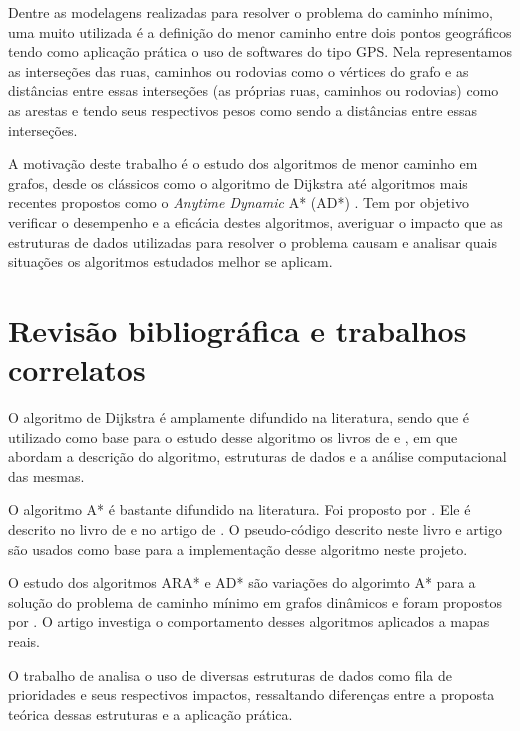 Dentre as modelagens realizadas para resolver o problema do caminho mínimo, uma muito utilizada é a definição do menor caminho entre dois pontos geográficos tendo como aplicação prática o uso de softwares do tipo GPS. Nela representamos as interseções das ruas, caminhos ou rodovias como o vértices do grafo e as distâncias entre essas interseções (as próprias ruas, caminhos ou rodovias) como as arestas e tendo seus respectivos pesos como sendo a distâncias entre essas interseções.


A motivação deste trabalho é o estudo dos algoritmos de menor caminho em grafos, desde os clássicos como o algoritmo de Dijkstra \cite{dijkstra1959note} até algoritmos mais recentes propostos como o \textit{Anytime Dynamic} A* (AD*) \cite{likhachev2008anytime}. Tem por  objetivo verificar o desempenho e a eficácia destes algoritmos, averiguar o impacto que as estruturas de dados utilizadas para resolver o problema causam e analisar quais situações os algoritmos estudados melhor se aplicam.

\section{Revisão bibliográfica e trabalhos correlatos}
\label{sec-intro-correlatos}
O algoritmo de Dijkstra é amplamente difundido na literatura, sendo que é utilizado como base para o estudo desse algoritmo os livros de  e , em que abordam a descrição do algoritmo, estruturas de dados e a análise computacional das mesmas.

O algoritmo A* é bastante difundido na literatura. Foi proposto por . Ele é descrito no livro de  e no artigo de . O pseudo-código descrito neste livro e artigo são usados como base para a implementação desse algoritmo neste projeto.

O estudo dos algoritmos ARA* e AD* são variações do algorimto A* para a solução do problema de caminho mínimo em grafos dinâmicos e foram propostos por . O artigo \cite{moura2010estudo} investiga o comportamento desses algoritmos aplicados a mapas reais. 

O trabalho de  analisa o uso de diversas estruturas de dados como fila de prioridades e seus respectivos impactos, ressaltando diferenças entre a proposta teórica dessas estruturas e a aplicação prática.
